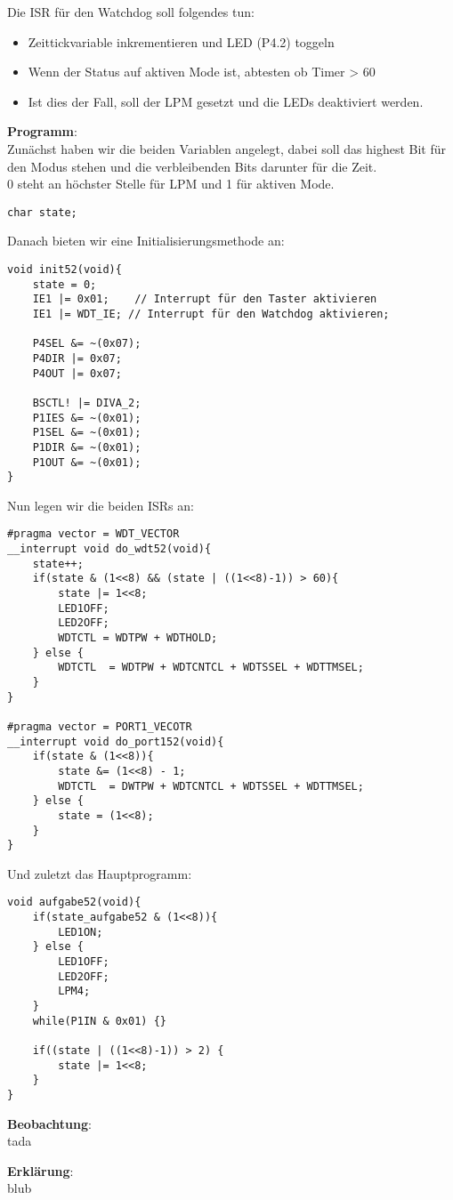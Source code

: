 Die ISR für den Watchdog soll folgendes tun:

\begin{itemize}
	\item Zeittickvariable inkrementieren und LED (P4.2) toggeln
	\item Wenn der Status auf aktiven Mode ist, abtesten ob Timer > 60
	\item Ist dies der Fall, soll der LPM gesetzt und die LEDs deaktiviert werden.
\end{itemize}

\textbf{Programm}:\\

Zunächst haben wir die beiden Variablen angelegt, dabei soll das highest Bit für den Modus stehen und die verbleibenden Bits darunter für die Zeit.\\
0 steht an höchster Stelle für LPM und 1 für aktiven Mode.

\begin{lstlisting}
char state;
\end{lstlisting}

Danach bieten wir eine Initialisierungsmethode an:

\begin{lstlisting}
void init52(void){
	state = 0;
	IE1 |= 0x01;	// Interrupt für den Taster aktivieren
	IE1 |= WDT_IE; // Interrupt für den Watchdog aktivieren;

	P4SEL &= ~(0x07);
	P4DIR |= 0x07;
	P4OUT |= 0x07;

	BSCTL! |= DIVA_2;
	P1IES &= ~(0x01);
	P1SEL &= ~(0x01);
	P1DIR &= ~(0x01);
	P1OUT &= ~(0x01);
}
\end{lstlisting}

Nun legen wir die beiden ISRs an:

\begin{lstlisting}
#pragma vector = WDT_VECTOR
__interrupt void do_wdt52(void){
	state++;
	if(state & (1<<8) && (state | ((1<<8)-1)) > 60){
		state |= 1<<8;
		LED1OFF;
		LED2OFF;
		WDTCTL = WDTPW + WDTHOLD;
	} else {
		WDTCTL  = WDTPW + WDTCNTCL + WDTSSEL + WDTTMSEL;
	}
}

#pragma vector = PORT1_VECOTR
__interrupt void do_port152(void){
	if(state & (1<<8)){
		state &= (1<<8) - 1;
		WDTCTL  = DWTPW + WDTCNTCL + WDTSSEL + WDTTMSEL;
	} else {
		state = (1<<8);
	}
}
\end{lstlisting}

Und zuletzt das Hauptprogramm:

\begin{lstlisting}
void aufgabe52(void){
	if(state_aufgabe52 & (1<<8)){
		LED1ON;
	} else {
		LED1OFF;
		LED2OFF;
		LPM4;
	}
	while(P1IN & 0x01) {}

	if((state | ((1<<8)-1)) > 2) {
		state |= 1<<8;
	}
}
\end{lstlisting}

\textbf{Beobachtung}:\\

tada

\textbf{Erklärung}:\\

blub